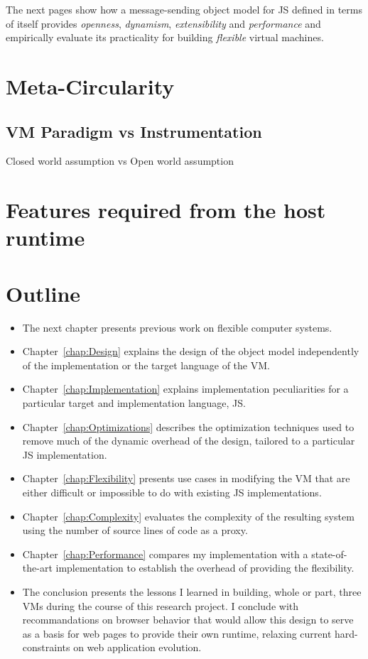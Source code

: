 The next pages show how a message-sending object model for JS defined in terms of
itself provides \textit{openness}, \textit{dynamism}, \textit{extensibility}
and \textit{performance} and empirically evaluate its practicality for building
\textit{flexible} virtual machines.

\section{Meta-Circularity}
\subsection{VM Paradigm vs Instrumentation}
Closed world assumption vs Open world assumption

\section{Features required from the host runtime}


\section{Outline}
\begin{itemize}
    \item The next chapter presents previous work on flexible computer systems.
    \item Chapter~\ref{chap:Design} explains the design of the object model
    independently of the implementation or the target language of the VM.
    \item Chapter~\ref{chap:Implementation} explains implementation
    peculiarities for a particular target and implementation language, JS.
    \item Chapter~\ref{chap:Optimizations} describes the optimization
    techniques used to remove much of the dynamic overhead of the design,
    tailored to a particular JS implementation.  
    \item Chapter~\ref{chap:Flexibility} presents use cases in modifying the VM
    that are either difficult or impossible to do with existing JS
    implementations.
    \item Chapter~\ref{chap:Complexity} evaluates the complexity of the
    resulting system using the number of source lines of code as a proxy.
    \item Chapter~\ref{chap:Performance} compares my implementation with a
    state-of-the-art implementation to establish the overhead of providing the
    flexibility.  
    \item The conclusion presents the lessons I learned in building, whole or
    part, three VMs during the course of this research project. I conclude with
    recommandations on browser behavior that would allow this design to
    serve as a basis for web pages to provide their own runtime, relaxing
    current hard-constraints on web application evolution.
\end{itemize}
